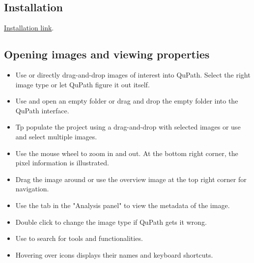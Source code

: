 \documentclass[a4paper,DIV=17,dvipsnames,headsepline]{scrartcl}
\begin{document}
\subsection{Installation}
\href{https://qupath.github.io}{Installation link}.

\subsection{Opening images and viewing properties}
\begin{itemize} 
    \item Use  or directly drag-and-drop images of interest into QuPath. 
    Select the right image type or let QuPath figure it out itself.
    \item Use  and open an empty folder or drag and drop the empty folder into the QuPath interface. 
    \item Tp populate the project using a drag-and-drop with selected images or use  and select multiple images.
    \item Use the mouse wheel to zoom in and out. At the bottom right corner, the pixel information is illustrated. 
    \item Drag the image around or use the overview image at the top right corner for navigation. 
    \item Use the  tab in the "Analysis panel" to view the metadata of the image. 
    \item Double click to change the image type if QuPath gets it wrong. 
    \item Use  to search for tools and functionalities. 
    \item Hovering over icons displays their names and keyboard shortcuts.
\end{itemize}
\end{document}
